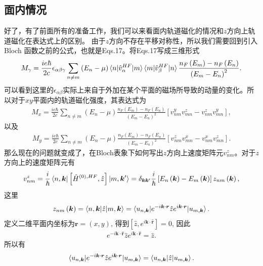 \documentclass[10pt, oneside]{article}
\newcommand{\pr}{\prime}
\newcommand{\p}[1]{\left(#1\right)}
\newcommand{\bb}[1]{\left[#1\right]}
\begin{document}
\subsection{面内情况}
好了，有了前面所有的准备工作，我们可以来看面内轨道磁化的情况和\(z\)方向上轨道磁化在表达式上的区别。 由于\(z\)方向不存在平移对称性，所以我们需要回到引入Bloch 函数之前的公式，也就是Eqs.17。将Eqs.17写成三维形式
\begin{align}
	M_{\gamma} = \frac{i e \hbar}{2 c} \epsilon_{\alpha \beta \gamma} \sum_{n \neq m} \p{E_n - \mu} \braket{n |  \hat{v}^{HF}_{\alpha}  | m } \braket{m|  \hat{v}^{HF}_{\beta} |n } \frac{n_{F} \p{E_{m} } - n_F \p{E_n}}{ \p{E_{m} - E_{n}}^2}.
\end{align}
可以看到这里的\(\epsilon_{\alpha \beta}\)实际上来自于外加在某个平面的磁场所导致的动量的变化。所以对于\(xy\)平面内的轨道磁化强度，其表达式为
\begin{align}
	M_x = \frac{i e \hbar}{2 c} \sum_{n \neq m} \p{E_n - \mu} \frac{n_{F} \p{E_{m} } - n_F \p{E_n}}{ \p{E_{m} - E_{n}}^2} \bb{v^{y}_{nm} v^{z}_{mn} - v^{z}_{nm} v^{y}_{mn} },
\end{align}
以及
\begin{align}
	M_y = \frac{i e \hbar}{2 c} \sum_{n \neq m} \p{E_n - \mu} \frac{n_{F} \p{E_{m} } - n_F \p{E_n}}{ \p{E_{m} - E_{n}}^2} \bb{v^{z}_{nm} v^{x}_{mn} - v^{x}_{nm} v^{z}_{mn} }.
\end{align}
那么现在的问题就变成了，在Bloch表象下如何写出\(z\)方向上速度矩阵元\(v^{z}_{nm}\)。对于\(z\)方向上的速度矩阵元有
\begin{align}
	v^{z}_{nm} = \frac{i}{\hbar} \braket{n,\bm{k}|\bb{ \hat{H}^{\p{0}, HF}, \hat{z}} | m , \bm{k}^\pr} = \delta_{\bm{k}\bm{k}^\pr}  \frac{i}{\hbar} \bb{E_n \p{\bm{k}} - E_m \p{\bm{k}}} z_{nm} \p{\bm{k}},
\end{align}
这里
\begin{align}
	z_{nm} \p{\bm{k}} = \braket{n,\bm{k} | \hat{z} | m, \bm{k}} = \braket{u_{n, \bm{k}} | e^{- i \bm{k} \cdot \bm{r} } \hat{z} e^{i \bm{k} \cdot \bm{r}} | u_{m,\bm{k}} }.
\end{align}
定义二维平面内坐标为\(\bm{r} = \p{x,y}\), 得到\(\bb{\hat{z}, e^{i \bm{k} \cdot \hat{\bm{r}}}} = 0\), 因此
\begin{align}
	e^{-i \bm{k} \cdot \hat{ \bm{r}}} \hat{z} e^{i \bm{k} \cdot \hat{ \bm{r}}}  = \hat{z}.
\end{align}
所以有
\begin{align}
	\braket{u_{n, \bm{k}} | e^{- i \bm{k} \cdot \bm{r} } \hat{z} e^{i \bm{k} \cdot \bm{r}} | u_{m,\bm{k}} } = \braket{u_{n, \bm{k}} | \hat{z} | u_{m,\bm{k}} }.
\end{align}
\end{document}
